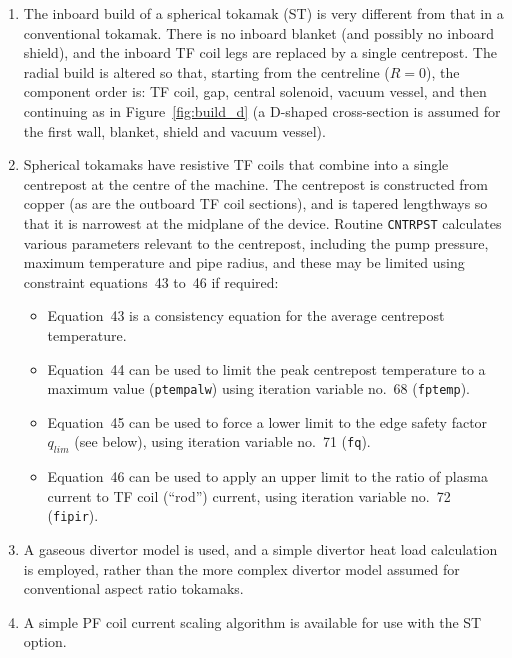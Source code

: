 \documentclass[11pt,a4paper]{report}
\begin{document}
\begin{enumerate}

\item The inboard build of a spherical tokamak (ST) is very different from
  that in a conventional tokamak. There is no inboard blanket (and possibly no
  inboard shield), and the inboard TF coil legs are replaced by a single
  centrepost. The radial build is altered so that, starting from the
  centreline ($R = 0$), the component order is: TF coil, gap, central
  solenoid, vacuum vessel, and then continuing as in Figure~\ref{fig:build_d}
  (a D-shaped cross-section is assumed for the first wall, blanket, shield and
  vacuum vessel).

\item Spherical tokamaks have resistive TF coils that combine into a single
  centrepost at the centre of the machine. The centrepost is constructed from
  copper (as are the outboard TF coil sections), and is tapered lengthways so
  that it is narrowest at the midplane of the device.  Routine
  \texttt{CNTRPST} calculates various parameters relevant to the centrepost,
  including the pump pressure, maximum temperature and pipe radius, and these
  may be limited using constraint equations~43 to~46 if required:

  \begin{itemize}
  \item Equation~43 is a consistency equation for the average centrepost
    temperature.
  \item Equation~44 can be used to limit the peak centrepost temperature to a
    maximum value (\texttt{ptempalw}) using iteration variable no.\ 68
    (\texttt{fptemp}).
  \item Equation~45 can be used to force a lower limit to the edge safety
    factor $q_{lim}$ (see below), using iteration variable no.\ 71 (\texttt{fq}).
  \item Equation~46 can be used to apply an upper limit to the ratio of plasma
    current to TF coil (``rod'') current, using iteration variable no.\ 72
    (\texttt{fipir}).
  \end{itemize}

\item A gaseous divertor model is used, and a simple divertor heat load
  calculation is employed, rather than the more complex divertor model assumed
  for conventional aspect ratio tokamaks.

\item A simple PF coil current scaling algorithm is available for use with the
  ST option.


\end{enumerate}
\end{document}
